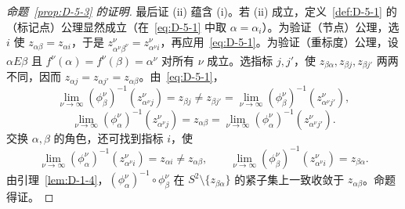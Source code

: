\begin{proof}[命题~\ref{prop:D-5-3} 的证明]
最后证 (ii) 蕴含 (i)。若 (ii) 成立，定义~\ref{def:D-5-1} 的（标记点）公理显然成立（在~\eqref{eq:D-5-1} 中取 $\alpha=\alpha_i$）。为验证（节点）公理，选 $i$ 使 $z_{\alpha\beta}=z_{\alpha i}$，于是 $z_{\alpha^\nu\beta^\nu}^\nu=z_{\alpha^\nu i}^\nu$，再应用~\eqref{eq:D-5-1}。为验证（重标度）公理，设 $\alpha E\beta$ 且 $f^\nu(\alpha)=f^\nu(\beta)=\alpha^\nu$ 对所有 $\nu$ 成立。选指标 $j,j'$，使 $z_{\beta\alpha},z_{\beta j},z_{\beta j'}$ 两两不同，因而 $z_{\alpha j}=z_{\alpha j'}=z_{\alpha\beta}$。由~\eqref{eq:D-5-1}，
\[
  \lim_{\nu\to\infty}(\phi_\beta^\nu)^{-1}(z_{\alpha^\nu j}^\nu)
   =z_{\beta j}\ne z_{\beta j'}
   =\lim_{\nu\to\infty}(\phi_\beta^\nu)^{-1}(z_{\alpha^\nu j'}^\nu),
\]
\[
  \lim_{\nu\to\infty}(\phi_\alpha^\nu)^{-1}(z_{\alpha^\nu j}^\nu)
   =z_{\alpha\beta}
   =\lim_{\nu\to\infty}(\phi_\alpha^\nu)^{-1}
       (z_{\alpha^\nu j'}^\nu).
\]
交换 $\alpha,\beta$ 的角色，还可找到指标 $i$，使
\[
  \lim_{\nu\to\infty}(\phi_\alpha^\nu)^{-1}(z_{\alpha^\nu i}^\nu)
    =z_{\alpha i}\ne z_{\alpha\beta},\qquad
  \lim_{\nu\to\infty}(\phi_\beta^\nu)^{-1}(z_{\alpha^\nu i}^\nu)
    =z_{\beta\alpha}.
\]
由引理~\ref{lem:D-1-4}，$(\phi_\alpha^\nu)^{-1}\circ\phi_\beta^\nu$ 在 $S^2\setminus\{z_{\beta\alpha}\}$ 的紧子集上一致收敛于 $z_{\alpha\beta}$。命题得证。
\end{proof}
